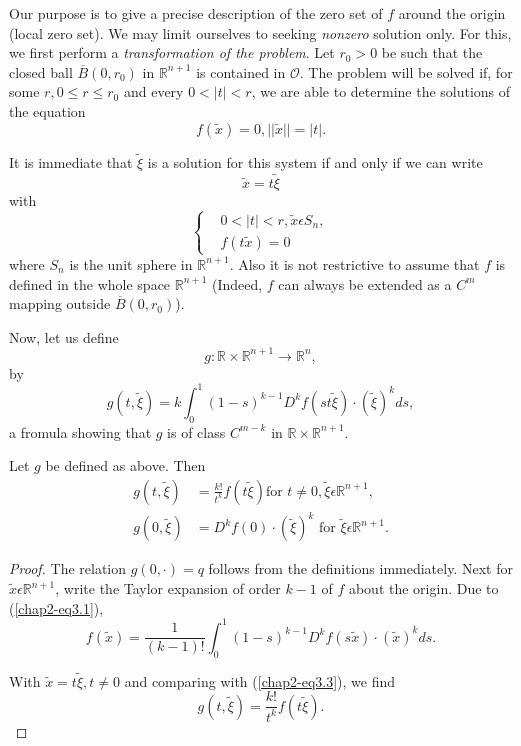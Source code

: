 Our purpose is to give a precise description of the zero set of $f$ around the origin (local zero set). We may limit ourselves to seeking {\em nonzero} solution only. For this, we first perform a {\em transformation of the problem}. Let $r_{0} > 0$ be such that the closed ball $\overline{B}(0, r_{0})$ in $\mathbb{R}^{n+1}$ is contained in $\mathscr{O}$. The problem will be solved if, for some $r, 0 \leq r \leq r_{0}$ and every $0 < |t| < r$, we are able to determine the solutions of the equation
$$
f(\widetilde{x}) = 0, ||\widetilde{x}|| = |t|.
$$

It is immediate that $\widetilde{\xi}$ is a solution for this system
if and only if we can write  
$$
\widetilde{x} = t \widetilde{\xi}
$$
with\pageoriginale
\begin{equation*}
\begin{cases}
& 0 < |t| < r, \widetilde{x} \epsilon S_{n},\\
& f(t \widetilde{x}) = 0
\end{cases}
\end{equation*}
where $S_{n}$ is the unit sphere in $\mathbb{R}^{n+1}$. Also it is not
restrictive to assume that $f$ is defined in the whole space
$\mathbb{R}^{n+1}$ (Indeed, $f$ can always be extended as a $C^{m}$
mapping outside $\overline{B} (0, r_{0})$).

Now, let us define
$$
g : \mathbb{R} \times \mathbb{R}^{n+1} \to \mathbb{R}^{n},
$$
by
\begin{equation*}
g(t, \widetilde{\xi}) = k \int_{0}^{1} (1-s)^{k-1} D^{k}f(st
\widetilde{\xi}) \cdot (\widetilde{\xi})^{k} ds,\tag{3.3}\label{chap2-eq3.3}
\end{equation*}
a fromula showing that $g$ is of class $C^{m-k}$ in $\mathbb{R} \times
\mathbb{R}^{n+1}$. 

\begin{lemma}\label{chap2-lem3.1}
Let $g$ be defined as above. Then
\begin{align*}
g(t, \widetilde{\xi}) & = \frac{k!}{t^{k}} f(t \widetilde{\xi}) \text{
for } t \neq 0, \widetilde{\xi} \epsilon
\mathbb{R}^{n+1},\tag{3.4}\label{chap2-eq3.4}\\
g(0, \widetilde{\xi}) & = D^{k} f(0) \cdot (\widetilde{\xi})^{k}
\text{ for } \widetilde{\xi} \epsilon \mathbb{R}^{n+1}.\tag{3.5}\label{chap2-eq3.5}
\end{align*}
\end{lemma}

\begin{proof}
The relation $g(0, \cdot) = q$ follows from the definitions
immediately. Next for $\widetilde{x} \epsilon \mathbb{R}^{n+1}$, write
the Taylor expansion of order $k-1$ of $f$ about the origin. Due to
(\ref{chap2-eq3.1}),
$$
f(\widetilde{x}) = \frac{1}{(k-1)!} \int_{0}^{1} (1-s)^{k-1} D^{k} f(s
\widetilde{x}) \cdot (\widetilde{x})^{k} ds.
$$

With $\widetilde{x} = t \widetilde{\xi}, t \neq 0$ and comparing with
(\ref{chap2-eq3.3}), we find
$$
g(t, \widetilde{\xi}) = \frac{k!}{t^{k}} f(t \widetilde{\xi}).
$$
\end{proof}

